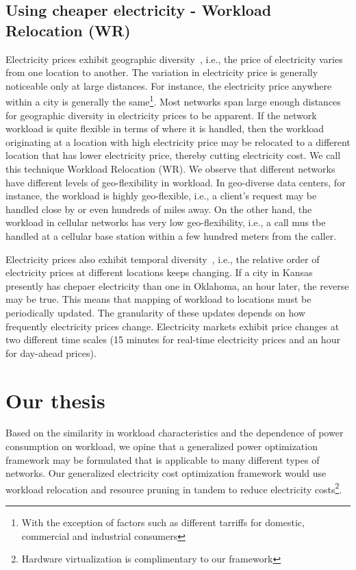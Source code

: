 \subsection{Using cheaper electricity - Workload Relocation (WR)}
Electricity prices exhibit geographic diversity~\cite{qureshiHotnets}, i.e., the price of electricity varies from one location to another. The variation in electricity price is generally noticeable only at large distances. For instance, the electricity price anywhere within a city is generally the same\footnote{With the exception of factors such as different tarriffs for domestic, commercial and industrial consumers}. Most networks span large enough distances for geographic diversity in electricity prices to be apparent. If the network workload is quite flexible in terms of where it is handled, then the workload originating at a location with high electricity price may be relocated to a different location that has lower electricity price, thereby cutting electricity cost. We call this technique Workload Relocation (WR). We observe that different networks have different levels of geo-flexibility in workload. In geo-diverse data centers, for instance, the workload is highly geo-flexible, i.e., a client's request may be handled close by or even hundreds of miles away. On the other hand, the workload in cellular networks has very low geo-flexibility, i.e., a call mus tbe handled at a cellular base station within a few hundred meters from the caller.

Electricity prices also exhibit temporal diversity~\cite{qureshiHotnets}, i.e., the relative order of electricity prices at different locations keeps changing. If a city in Kansas presently has chepaer electricity than one in Oklahoma, an hour later, the reverse may be true. This means that mapping of workload to locations must be periodically updated. The granularity of these updates depends on how frequently electricity prices change. Electricity markets exhibit price changes at two different time scales (15 minutes for real-time electricity prices and an hour for day-ahead prices). 



\section{Our thesis} Based on the similarity in workload characteristics and the dependence of power consumption on workload, we opine that a generalized power optimization framework may be formulated that is applicable to many different types of networks. Our generalized electricity cost optimization framework would use workload relocation and resource pruning in tandem to reduce electricity costs\footnote{Hardware virtualization is complimentary to our framework}. 

